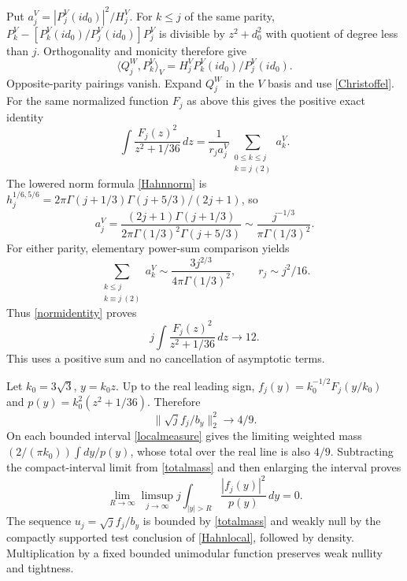 Put $a_j^V=|P_j^V(id_0)|^2/H_j^V$. For $k\le j$ of the same parity,
$P_k^V-[P_k^V(id_0)/P_j^V(id_0)]P_j^V$ is divisible by $z^2+d_0^2$
with quotient of degree less than $j$. Orthogonality and monicity
therefore give
\[
 \langle Q_j^W,P_k^V\rangle_V
       =H_j^V P_k^V(id_0)/P_j^V(id_0).
\]
Opposite-parity pairings vanish. Expand $Q_j^W$ in the $V$ basis
and use \eqref{Christoffel}. For the same normalized function $F_j$
as above this gives the positive exact identity
\begin{equation}\label{normidentity}
 \int\frac{F_j(z)^2}{z^2+1/36}\,dz
       =\frac1{r_ja_j^V}\sum_{\substack{0\le k\le j\\k\equiv j\ (2)}}a_k^V.
\end{equation}
The lowered norm formula \eqref{Hahnnorm} is
$h_j^{1/6,5/6}=2\pi\Gamma(j+1/3)\Gamma(j+5/3)/(2j+1)$,
so
\[
 a_j^V=\frac{(2j+1)\Gamma(j+1/3)}
                  {2\pi\Gamma(1/3)^2\Gamma(j+5/3)}
      \sim\frac{j^{-1/3}}{\pi\Gamma(1/3)^2}.
\]
For either parity, elementary power-sum comparison yields
\[
 \sum_{\substack{k\le j\\k\equiv j\ (2)}}a_k^V
       \sim\frac{3j^{2/3}}{4\pi\Gamma(1/3)^2},\qquad r_j\sim j^2/16.
\]
Thus \eqref{normidentity} proves
\begin{equation}\label{totalmassz}
 j\int\frac{F_j(z)^2}{z^2+1/36}\,dz\longrightarrow12.
\end{equation}
This uses a positive sum and no cancellation of asymptotic terms.

Let $k_0=3\sqrt3$, $y=k_0z$. Up to the real leading sign,
$f_j(y)=k_0^{-1/2}F_j(y/k_0)$ and
$p(y)=k_0^2(z^2+1/36)$. Therefore
\begin{equation}\label{totalmass}
 \|\sqrt j f_j/b_y\|_2^2\longrightarrow4/9.
\end{equation}
On each bounded interval \eqref{localmeasure} gives the limiting
weighted mass $(2/(\pi k_0))\int dy/p(y)$, whose total over the real
line is also $4/9$. Subtracting the compact-interval limit from
\eqref{totalmass} and then enlarging the interval proves
\begin{equation}\label{tightness}
 \lim_{R\to\infty}\limsup_{j\to\infty}
      j\int_{|y|>R}\frac{|f_j(y)|^2}{p(y)}\,dy=0.
\end{equation}
The sequence $u_j=\sqrt j f_j/b_y$ is bounded by \eqref{totalmass}
and weakly null by the compactly supported test conclusion of
\eqref{Hahnlocal}, followed by density. Multiplication by a fixed
bounded unimodular function preserves weak nullity and tightness.

